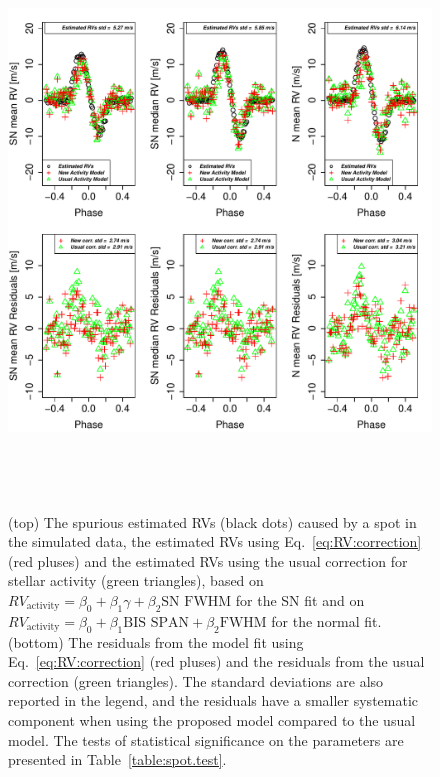 \documentclass{aa}
\begin{document}
\begin{figure}[htbp]
\begin{center}
\includegraphics[height = 6in]{SPOT_COMPARISON_withNoise.pdf}
   \caption{(top) The spurious estimated RVs (black dots) caused by a spot in the simulated data, the estimated RVs using Eq.~\eqref{eq:RV:correction} (red pluses) and the estimated RVs using the usual correction for stellar activity (green triangles), based on $RV_{\text{activity}}=\beta_0+\beta_1 \gamma + \beta_2 \text{SN FWHM}$ for the SN fit and on $RV_{\text{activity}}=\beta_0+\beta_1 \text{BIS SPAN} + \beta_2 \text{FWHM}$ for the normal fit.
 (bottom) The residuals from the model fit using Eq.~\eqref{eq:RV:correction} (red pluses) and the residuals from the usual correction (green triangles). 
 The standard deviations are also reported in the legend, and the residuals have a smaller systematic component when using the proposed model compared to the usual model.
The tests of statistical significance on the parameters are presented in Table~\ref{table:spot.test}.
}
    \label{fig:spot.correction}
\end{center}
\end{figure}
\end{document}
